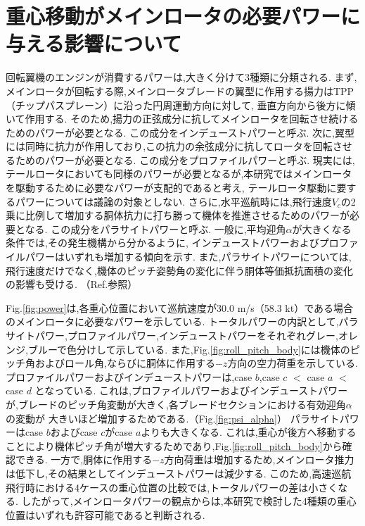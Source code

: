     \section{重心移動がメインロータの必要パワーに与える影響について}
    \label{sec:power}
    \par
    回転翼機のエンジンが消費するパワーは,大きく分けて3種類に分類される.
    まず,メインロータが回転する際,メインロータブレードの翼型に作用する揚力はTPP（チップパスプレーン）に沿った円周運動方向に対して,
    垂直方向から後方に傾いて作用する.
    そのため,揚力の正弦成分に抗してメインロータを回転させ続けるためのパワーが必要となる.
    この成分をインデューストパワーと呼ぶ.
    次に,翼型には同時に抗力が作用しており,この抗力の余弦成分に抗してロータを回転させるためのパワーが必要となる.
    この成分をプロファイルパワーと呼ぶ.
    現実には,テールロータにおいても同様のパワーが必要となるが,本研究ではメインロータを駆動するために必要なパワーが支配的であると考え,
    テールロータ駆動に要するパワーについては議論の対象としない.
    さらに,水平巡航時には,飛行速度$V_c$の2乗に比例して増加する胴体抗力に打ち勝って機体を推進させるためのパワーが必要となる.
    この成分をパラサイトパワーと呼ぶ.
    一般に,平均迎角$\alpha$が大きくなる条件では,その発生機構から分かるように,
    インデューストパワーおよびプロファイルパワーはいずれも増加する傾向を示す.
    また,パラサイトパワーについては,飛行速度だけでなく,機体のピッチ姿勢角の変化に伴う胴体等価抵抗面積の変化の影響も受ける.
    （Ref.\cite{Yoshizaki_master}参照）
    \par
    Fig.\ref{fig:power}は,各重心位置において巡航速度が30.0 m/s（58.3 kt）である場合のメインロータに必要なパワーを示している.
    トータルパワーの内訳として,パラサイトパワー,プロファイルパワー,インデューストパワーをそれぞれグレー,オレンジ,ブルーで色分けして示している.
    また,Fig.\ref{fig:roll_pitch_body}には機体のピッチ角およびロール角,ならびに胴体に作用する$-z$方向の空力荷重を示している.
    プロファイルパワーおよびインデューストパワーは,case $b$,case $c$ $<$ case $a$ $<$ case $d$ となっている.
    これは,プロファイルパワーおよびインデューストパワーが,ブレードのピッチ角変動が大きく,各ブレードセクションにおける有効迎角$\alpha$の変動が
    大きいほど増加するためである.（Fig.\ref{fig:psi_alpha}）
    パラサイトパワーはcase $b$およびcase $c$がcase $a$よりも大きくなる.
    これは,重心が後方へ移動することにより機体ピッチ角が増大するためであり,Fig.\ref{fig:roll_pitch_body}から確認できる.
    一方で,胴体に作用する$-z$方向荷重は増加するため,メインロータ推力は低下し,その結果としてインデューストパワーは減少する.
    このため,高速巡航飛行時における4ケースの重心位置の比較では,トータルパワーの差は小さくなる.
    したがって,メインロータパワーの観点からは,本研究で検討した4種類の重心位置はいずれも許容可能であると判断される.
   
